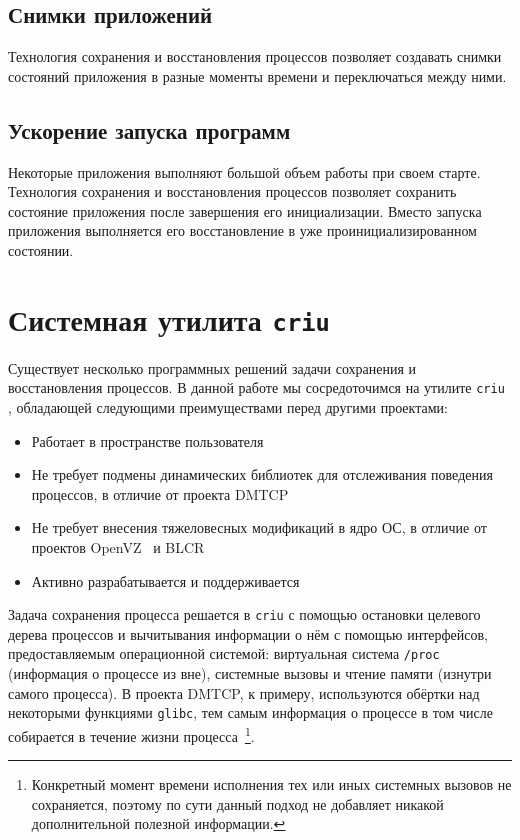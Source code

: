 \subsection{Снимки приложений}
 
Технология сохранения и восстановления процессов позволяет создавать снимки состояний приложения в разные моменты времени и переключаться между ними. 
 
\subsection{Ускорение запуска программ}
 
Некоторые приложения выполняют большой объем работы при своем старте. Технология сохранения и восстановления процессов позволяет сохранить состояние приложения после завершения его инициализации. Вместо запуска приложения выполняется его восстановление в уже проинициализированном состоянии.

\section{Системная утилита \texttt{criu}}

Существует несколько программных решений задачи сохранения и восстановления процессов. В данной работе мы сосредоточимся на утилите \texttt{criu} \cite{url:criu}, обладающей следующими преимуществами перед другими проектами:

\begin{itemize}
	\item Работает в пространстве пользователя
	\item Не требует подмены динамических библиотек для отслеживания поведения процессов, в отличие от проекта DMTCP \cite{url:dmtcp}
	\item Не требует внесения тяжеловесных модификаций в ядро ОС, в отличие от проектов OpenVZ~\cite{url:openvz} и BLCR~\cite{url:blcr}
	\item Активно разрабатывается и поддерживается
\end{itemize}

Задача сохранения процесса решается в \texttt{criu} с помощью остановки целевого дерева процессов и вычитывания информации о нём с помощью интерфейсов, предоставляемым операционной системой: виртуальная система \texttt{/proc} (информация о процессе из вне), системные вызовы и чтение памяти (изнутри самого процесса). В проекта DMTCP, к примеру, используются обёртки над некоторыми функциями \texttt{glibc}, тем самым информация о процессе в том числе собирается в течение жизни процесса~\footnote{Конкретный момент времени исполнения тех или иных системных вызовов не сохраняется, поэтому по сути данный подход не добавляет никакой дополнительной полезной информации.}.

